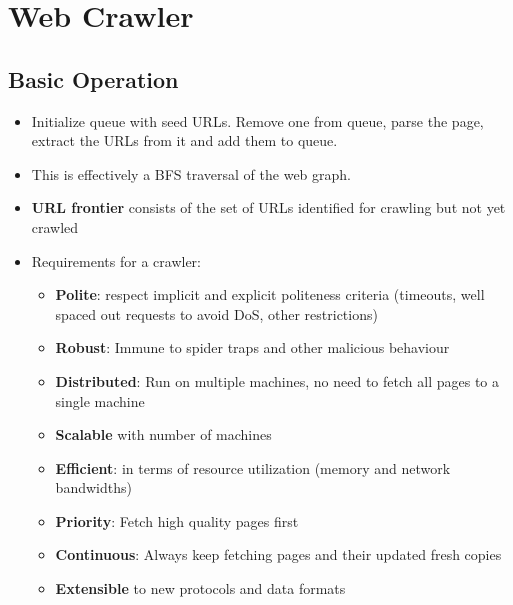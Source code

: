 \documentclass{article}
\begin{document}
\section{Web Crawler}
\subsection{Basic Operation}
\begin{itemize}
    \item Initialize queue with seed URLs. Remove one from queue, parse the page, extract the URLs from it and add them to queue. 
    
    \item This is effectively a BFS traversal of the web graph. 
    
    \item \textbf{URL frontier} consists of the set of URLs identified for crawling but not yet crawled
    
    \item Requirements for a crawler:
    \begin{itemize}
        \item \textbf{Polite}: respect implicit and explicit politeness criteria (timeouts, well spaced out requests to avoid DoS, other restrictions)
        
        \item \textbf{Robust}: Immune to spider traps and other malicious behaviour
        
        \item \textbf{Distributed}: Run on multiple machines, no need to fetch all pages to a single machine
        
        \item \textbf{Scalable} with number of machines
        
        \item \textbf{Efficient}: in terms of resource utilization (memory and network bandwidths)
        
        \item \textbf{Priority}: Fetch high quality pages first
        
        \item \textbf{Continuous}: Always keep fetching pages and their updated fresh copies 
        
        \item \textbf{Extensible} to new protocols and data formats
    \end{itemize}
    

\end{itemize}
\end{document}
